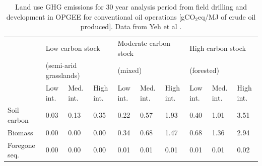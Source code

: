 \documentclass[11pt]{report}
\begin{document}
\begin{table}
\begin{scriptsize}
\caption{Land use GHG emissions for 30 year analysis period from field drilling and development in OPGEE for conventional oil operations [gCO$_2$eq/MJ of crude oil produced]. Data from Yeh et al \cite{Yeh2010}.}
\label{tab:default_land_use_emissions}
\begin{tabular}{p{}p{}p{}p{}p{}p{}p{}p{}p{}p{}}
\toprule
& \multicolumn{3}{p{0.25\columnwidth}}{Low carbon stock } & \multicolumn{3}{p{0.25\columnwidth}}{Moderate carbon stock } & \multicolumn{3}{p{0.25\columnwidth}}{High carbon stock}\\
& \multicolumn{3}{p{0.25\columnwidth}}{(semi-arid grasslands)} & \multicolumn{3}{p{0.25\columnwidth}}{(mixed)} & \multicolumn{3}{p{0.25\columnwidth}}{(forested)}\\
\cmidrule{2-4} \cmidrule{5-7} \cmidrule{8-10}
& Low int. & Med. int. & High int. & Low int. & Med. int. & High int. & Low int. & Med. int. & High int.\\
\midrule
Soil carbon & 0.03 & 0.13 & 0.35 & 0.22 & 0.57 & 1.93 & 0.40 & 1.01 & 3.51\\
Biomass & 0.00 & 0.00 & 0.00 & 0.34 & 0.68 & 1.47 & 0.68 & 1.36 & 2.94\\
Foregone seq.\ & 0.00 & 0.00 & 0.00 & 0.01 & 0.01 & 0.01 & 0.01 & 0.01 & 0.02\\
\bottomrule
\end{tabular}
\end{scriptsize}
\end{table}
\end{document}
